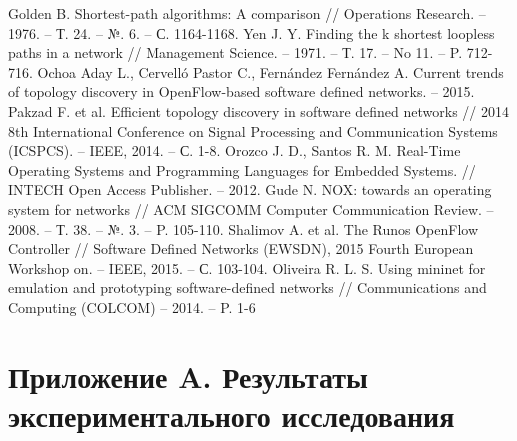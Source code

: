 \documentclass[12pt, a4paper]{article}
\begin{document}
\begin{thebibliography}{}
	Golden B. Shortest-path algorithms: A comparison // Operations Research. -- 1976. -- Т. 24. -- №. 6. -- С. 1164-1168.
	Yen J. Y. Finding the k shortest loopless paths in a network // Management Science. -- 1971. -- Т. 17. -- No 11. -- P. 712-716.
	Ochoa Aday L., Cervelló Pastor C., Fernández Fernández A. Current trends of topology discovery in OpenFlow-based software defined networks. -- 2015.
	Pakzad F. et al. Efficient topology discovery in software defined networks // 2014 8th International Conference on Signal Processing and Communication Systems (ICSPCS). -- IEEE, 2014. -- С. 1-8.
	Orozco J. D., Santos R. M. Real-Time Operating Systems and Programming Languages for Embedded Systems. // INTECH Open Access Publisher. -- 2012.
	Gude N. NOX: towards an operating system for networks // ACM SIGCOMM Computer Communication Review. -- 2008. -- Т. 38. -- №. 3. -- P. 105-110.
	Shalimov A. et al. The Runos OpenFlow Controller // Software Defined Networks (EWSDN), 2015 Fourth European Workshop on. -- IEEE, 2015. -- С. 103-104.
	Oliveira R. L. S. Using mininet for emulation and prototyping software-defined networks // Communications and Computing (COLCOM) -- 2014. -- P. 1-6
\end{thebibliography}


\section*{Приложение A. Результаты экспериментального исследования} \label{sec:results}
\end{document}

